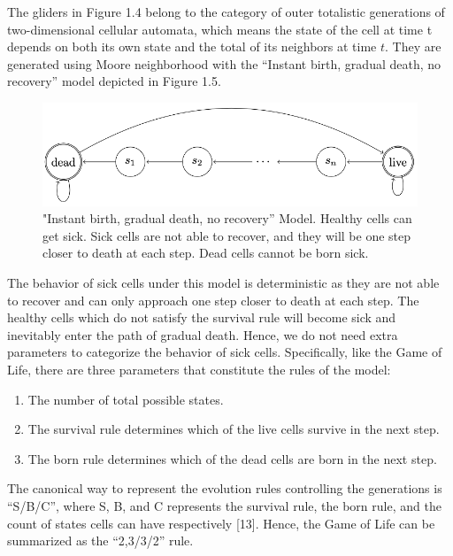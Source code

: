 \documentclass[12pt]{article}
\numberwithin{figure}{section} %
\begin{document}
The gliders in Figure 1.4 belong to the category of outer totalistic generations of two-dimensional cellular automata, which means the state of the cell at time t depends on both its own state and the total of its neighbors at time $t$. They are generated using Moore neighborhood with the “Instant birth, gradual death, no recovery” model depicted in Figure 1.5. 

\begin{figure}[H]
\centering
\includegraphics[width=\linewidth]{Section1/9}
\caption{"Instant birth, gradual death, no recovery” Model. Healthy cells can get sick. Sick cells are not able to recover, and they will be one step closer to death at each step. Dead cells cannot be born sick.}
\vspace{-1.5em}
\end{figure}

The behavior of sick cells under this model is deterministic as they are not able to recover and can only approach one step closer to death at each step. The healthy cells which do not satisfy the survival rule will become sick and inevitably enter the path of gradual death. Hence, we do not need extra parameters to categorize the behavior of sick cells. Specifically, like the Game of Life, there are three parameters that constitute the rules of the model: 
\begin{enumerate}[topsep=0pt,itemsep=-1ex,partopsep=1ex,parsep=1ex]
\item The number of total possible states. 
\item The survival rule determines which of the live cells survive in the next step. 
\item The born rule determines which of the dead cells are born in the next step. 
\end{enumerate}
The canonical way to represent the evolution rules controlling the generations is “S/B/C”, where S, B, and C represents the survival rule, the born rule, and the count of states cells can have respectively [13]. Hence, the Game of Life can be summarized as the “2,3/3/2” rule.
\end{document}
